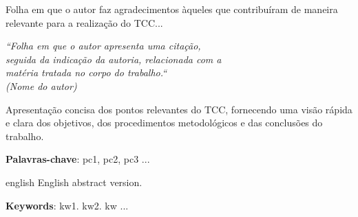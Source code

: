 \documentclass{unemat-tex}
\begin{document}
\begin{agradecimentos}
	Folha em que o autor faz agradecimentos àqueles que contribuíram de maneira relevante para a realização do TCC...
\end{agradecimentos}


\begin{epigrafe}
	\vspace*{\fill}
	\begin{flushright}
		\textit{
			``Folha em que o autor apresenta uma citação,\\
			seguida da indicação da autoria, relacionada com a\\
			matéria tratada no corpo do trabalho.``\\
			(Nome do autor)
		}
	\end{flushright}
\end{epigrafe}


\setlength{\absparsep}{18pt} %

\begin{resumo}
	Apresentação concisa dos pontos relevantes do TCC, fornecendo uma visão rápida e clara dos objetivos, dos procedimentos metodológicos e das conclusões do trabalho.
	
	\textbf{Palavras-chave}: pc1, pc2, pc3 ...
\end{resumo}

\begin{resumo}[Abstract]
	\begin{otherlanguage*}{english}
		English abstract version.
		
		\noindent 
		\textbf{Keywords}: kw1. kw2. kw ...
	\end{otherlanguage*}
\end{resumo}


\listoffigures*
\cleardoublepage
\end{document}
